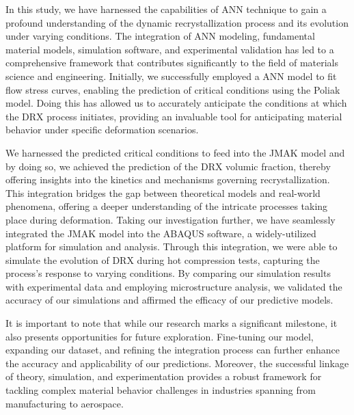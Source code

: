 \documentclass[metals,article,submit,pdftex,moreauthors]{Definitions/mdpi}
\begin{document}
In this study, we have harnessed the capabilities of ANN technique to gain a profound understanding of the dynamic recrystallization process and its evolution under varying conditions.
The integration of ANN modeling, fundamental material models, simulation software, and experimental validation has led to a comprehensive framework that contributes significantly to the field of materials science and engineering.
Initially, we successfully employed a ANN model to fit flow stress curves, enabling the prediction of critical conditions using the Poliak model.
Doing this has allowed us to accurately anticipate the conditions at which the DRX process initiates, providing an invaluable tool for anticipating material behavior under specific deformation scenarios.

We harnessed the predicted critical conditions to feed into the JMAK model and by doing so, we achieved the prediction of the DRX volumic fraction, thereby offering insights into the kinetics and mechanisms governing recrystallization.
This integration bridges the gap between theoretical models and real-world phenomena, offering a deeper understanding of the intricate processes taking place during deformation.
Taking our investigation further, we have seamlessly integrated the JMAK model into the ABAQUS software, a widely-utilized platform for simulation and analysis.
Through this integration, we were able to simulate the evolution of DRX during hot compression tests, capturing the process's response to varying conditions.
By comparing our simulation results with experimental data and employing microstructure analysis, we validated the accuracy of our simulations and affirmed the efficacy of our predictive models.

It is important to note that while our research marks a significant milestone, it also presents opportunities for future exploration.
Fine-tuning our model, expanding our dataset, and refining the integration process can further enhance the accuracy and applicability of our predictions.
Moreover, the successful linkage of theory, simulation, and experimentation provides a robust framework for tackling complex material behavior challenges in industries spanning from manufacturing to aerospace.


\vspace{6pt}
\end{document}

